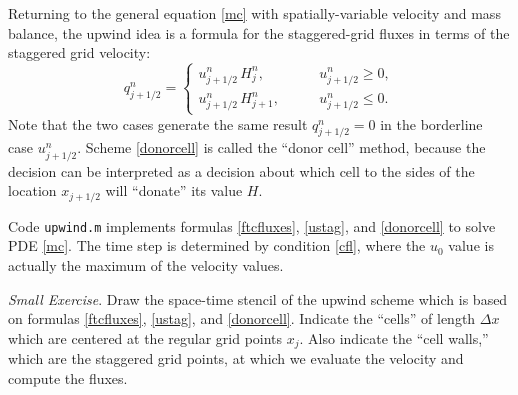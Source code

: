\documentclass[titlepage,a4paper,final,12pt]{scrartcl}
\newcommand{\minput}[1]{
\bigskip
\begin{quote}
\bigskip
\VerbatimInput[frame=single,framesep=3mm,label=\fbox{\normalsize \textsl{\,#1.m\,}},fontfamily=courier,fontsize=\scriptsize]{#1.m}
\bigskip
\end{quote}
}
\begin{document}
Returning to the general equation \eqref{mc} with spatially-variable velocity and mass balance, the upwind idea is a formula for the staggered-grid fluxes in terms of the staggered grid velocity:
\begin{equation}
q_{j+1/2}^n = \begin{cases} u_{j+1/2}^n \, H_j^n, & \qquad u_{j+1/2}^n \ge 0, \\
                            u_{j+1/2}^n \, H_{j+1}^n, & \qquad u_{j+1/2}^n \le 0. \end{cases}
\label{donorcell}
\end{equation}
Note that the two cases generate the same result $q_{j+1/2}^n=0$ in the borderline case $u_{j+1/2}^n$.  Scheme \eqref{donorcell} is called the ``donor cell'' method, because the decision can be interpreted as a decision about which cell to the sides of the location $x_{j+1/2}$ will ``donate'' its value $H$.

Code \texttt{upwind.m} implements formulas \eqref{ftcfluxes}, \eqref{ustag}, and \eqref{donorcell} to solve PDE \eqref{mc}.  The time step is determined by condition \eqref{cfl}, where the $u_0$ value is actually the maximum of the velocity values.

\medskip
\noindent \emph{Small Exercise}.  Draw the space-time stencil of the upwind scheme which is based on formulas \eqref{ftcfluxes}, \eqref{ustag}, and \eqref{donorcell}.  Indicate the ``cells'' of length $\Delta x$ which are centered at the regular grid points $x_j$.  Also indicate the ``cell walls,'' which are the staggered grid points, at which we evaluate the velocity and compute the fluxes.
\medskip




\small


\end{document}

